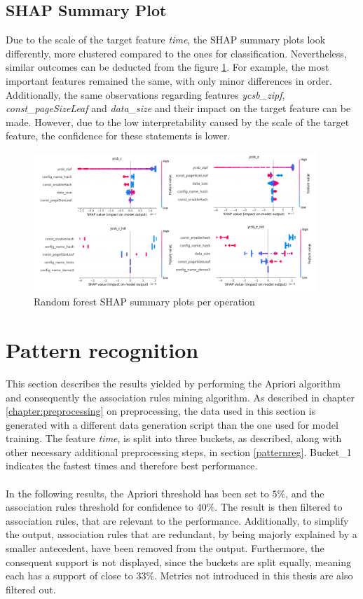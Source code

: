 \subsection{SHAP Summary Plot}
Due to the scale of the target feature \textit{time}, the SHAP summary plots look differently, more clustered compared to the ones for classification. Nevertheless, similar outcomes can be deducted from the figure \ref{fig:shap_reg}. For example, the most important features remained the same, with only minor differences in order. Additionally, the same observations regarding features \textit{ycsb\_zipf}, \textit{const\_pageSizeLeaf} and \textit{data\_size} and their impact on the target feature can be made. However, due to the low interpretability caused by the scale of the target feature, the confidence for these statements is lower.


\begin{figure}[H]
      \centering
      \includegraphics[width=0.95\textwidth]{images/shap_reg.png}
      \caption{Random forest SHAP summary plots per operation}
      \label{fig:shap_reg}
  \end{figure}




\section{Pattern recognition}
This section describes the results yielded by performing the Apriori algorithm and consequently the association rules mining algorithm. As described in chapter \ref{chapter:preprocessing} on preprocessing, the data used in this section is generated with a different data generation script than the one used for model training. The feature \textit{time}, is split into three buckets, as described, along with other necessary additional preprocessing steps, in section \ref{patternreg}. Bucket\_1 indicates the fastest times and therefore best performance.
\\\\
In the following results, the Apriori threshold has been set to $5\%$, and the association rules threshold for confidence to $40\%$. The result is then filtered to association rules, that are relevant to the performance. Additionally, to simplify the output, association rules that are redundant, by being majorly explained by a smaller antecedent, have been removed from the output. Furthermore, the consequent support is not displayed, since the buckets are split equally, meaning each has a support of close to $33\%$. Metrics not introduced in this thesis are also filtered out. 

